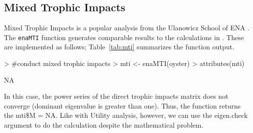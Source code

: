 \documentclass[article]{jss}
\begin{document}

\subsection{Mixed Trophic Impacts}
Mixed Trophic Impacts is a popular analysis from the Ulanowicz School
of ENA \citep{ulanowicz90}.  The \texttt{enaMTI} function generates
comparable results to the calculations in \citet{ulanowicz90}.  These
are implemented as follows; Table~\ref{tab:mti} summarizes the
function output.

\begin{Schunk}
\begin{Sinput}
>                                         #conduct mixed trophic impacts
> mti <- enaMTI(oyster)
> attributes(mti)
\end{Sinput}
\begin{Soutput}
[1] NA
\end{Soutput}
\end{Schunk}

In this case, the power series of the direct trophic impacts matrix
does not converge (dominant eigenvalue is greater than one).  Thus,
the function returns the mti\$M = NA.  Like with Utility analysis,
however, we can use the eigen.check argument to do the calculation
despite the mathematical problem.
\end{document}
